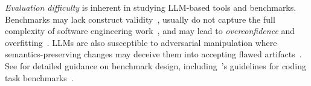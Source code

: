 \emph{Evaluation difficulty} is inherent in studying LLM-based tools and benchmarks. Benchmarks may lack construct validity~\cite{DBLP:books/sp/24/RalphKAA24}, usually do not capture the full complexity of software engineering work~\cite{Chandra2025benchmarks}, and may lead to \emph{overconfidence} and overfitting~\cite{DBLP:journals/corr/abs-2412-03597}. LLMs are also susceptible to adversarial manipulation where semantics-preserving changes may deceive them into accepting flawed artifacts~\cite{DBLP:journals/corr/abs-2510-24367}. See \benchmarksmetrics for detailed guidance on benchmark design, including~\citeauthor{cao2025should}'s guidelines for coding task benchmarks~\cite{cao2025should}.

